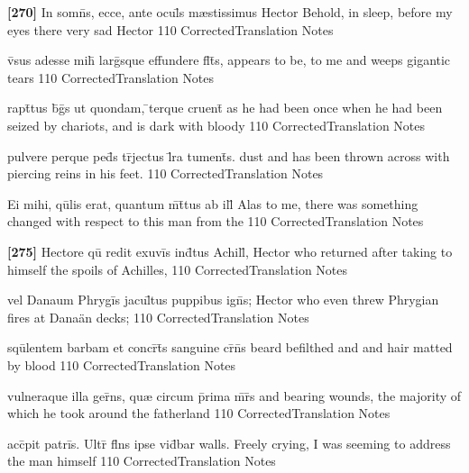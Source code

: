 \latline
  {\textbf{[270]} In somn\={\macron {\i}}s, ecce, ante ocul\={}s m{\ae}stissimus Hector}
  { Behold, in sleep, before my eyes there very sad Hector   }
  {110}
  { CorrectedTranslation }
  { Notes }


\latline
  {v\={\macron {\i}}sus adesse mih\={\macron {\i}} larg\={}sque effundere fl\={}t\={}s,}
  { appears to be, to me and weeps gigantic tears }
  {110}
  { CorrectedTranslation }
  { Notes }


\latline
  {rapt\={}tus b\={\macron {\i}}g\={\macron {\i}}s ut quondam, \={}terque cruent\={}}
  { as he had been once when he had been seized by chariots, and is dark with bloody }
  {110}
  { CorrectedTranslation }
  { Notes }


\latline
  {pulvere perque ped\={}s tr\={}jectus l\={}ra tument\={\macron {\i}}s.}
  { dust and has been thrown across with piercing reins in his feet. }
  {110}
  { CorrectedTranslation }
  { Notes }


\latline
  {Ei mihi, qu\={}lis erat, quantum m\={}t\={}tus ab ill\={}}
  { Alas to me, there was something changed with respect to this man from the }
  {110}
  { CorrectedTranslation }
  { Notes }


\latline
  {\textbf{[275]} Hectore qu\={\macron {\i}} redit exuvi\={}s ind\={}tus Achill\={\macron {\i}},}
  { Hector who returned after taking to himself the spoils of Achilles, }
  {110}
  { CorrectedTranslation }
  { Notes }


\latline
  {vel Danaum Phrygi\={}s jacul\={}tus puppibus ign\={\macron {\i}}s;}
  { Hector who even threw Phrygian fires at Dana\"an decks; }
  {110}
  { CorrectedTranslation }
  { Notes }


\latline
  {squ\={}lentem barbam et concr\={}t\={}s sanguine cr\={\macron {\i}}n\={\macron {\i}}s}
  { beard befilthed and and hair matted by blood }
  {110}
  { CorrectedTranslation }
  { Notes }


\latline
  {vulneraque illa ger\={}ns, qu{\ae} circum p\={}rima m\={}r\={}s}
  { and bearing wounds, the majority of which he took around the fatherland }
  {110}
  { CorrectedTranslation }
  { Notes }


\latline
  {acc\={}pit patri\={}s.  Ultr\={} fl\={}ns ipse vid\={}bar}
  { walls.  Freely crying, I was seeming to address the man himself}
  {110}
  { CorrectedTranslation }
  { Notes }


